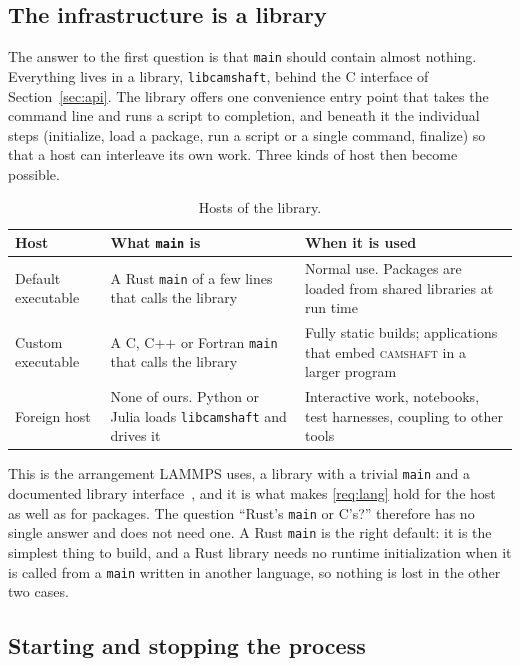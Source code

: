 \documentclass[11pt,a4paper]{article}
\newcommand{\camshaft}{\textsc{camshaft}}
\newcommand{\code}[1]{\texttt{#1}}
\begin{document}
\subsection{The infrastructure is a library}

The answer to the first question is that \code{main} should contain almost
nothing.  Everything lives in a library, \code{libcamshaft}, behind the C
interface of Section~\ref{sec:api}.  The library offers one convenience entry
point that takes the command line and runs a script to completion, and
beneath it the individual steps (initialize, load a package, run a script or
a single command, finalize) so that a host can interleave its own work.
Three kinds of host then become possible.

\begin{table}[ht]
\centering
\small
\begin{tabularx}{\textwidth}{@{}l L L@{}}
\toprule
Host & What \code{main} is & When it is used \\
\midrule
Default executable & A Rust \code{main} of a few lines that calls the library & Normal use.  Packages are loaded from shared libraries at run time \\
Custom executable & A C, C++ or Fortran \code{main} that calls the library & Fully static builds; applications that embed \camshaft{} in a larger program \\
Foreign host & None of ours.  Python or Julia loads \code{libcamshaft} and drives it & Interactive work, notebooks, test harnesses, coupling to other tools \\
\bottomrule
\end{tabularx}
\caption{Hosts of the library.}
\label{tab:hosts}
\end{table}

This is the arrangement LAMMPS uses, a library with a trivial \code{main}
and a documented library interface~\cite{lammps}, and it is what makes
\ref{req:lang} hold for the host as well as for packages.  The question
\enquote{Rust's \code{main} or C's?} therefore has no single answer and does
not need one.  A Rust \code{main} is the right default: it is the simplest
thing to build, and a Rust library needs no runtime initialization when it is
called from a \code{main} written in another language, so nothing is lost in
the other two cases.

\subsection{Starting and stopping the process}
\end{document}
